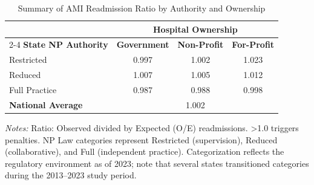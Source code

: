 \begin{table}[htbp]
    \centering
    \caption{Summary of AMI Readmission Ratio by Authority and Ownership}
    \label{tab:rrp_excess_ratio_ami}
    \vspace{0.2cm}
    \begin{tabular}{lccc}
        \toprule
        & \multicolumn{3}{c}{\textbf{Hospital Ownership}} \\
        \cmidrule(lr){2-4}
        \textbf{State NP Authority} & \textbf{Government} & \textbf{Non-Profit} & \textbf{For-Profit} \\
        \midrule
        Restricted & 0.997 & 1.002 & 1.023 \\
        Reduced & 1.007 & 1.005 & 1.012 \\
        Full Practice & 0.987 & 0.988 & 0.998 \\
        \midrule
        \textbf{National Average} & \multicolumn{3}{c}{1.002} \\
        \bottomrule
    \end{tabular}
    \vspace{0.1cm}
    \begin{minipage}{0.85\textwidth}
        \footnotesize \textit{Notes:} Ratio: Observed divided by Expected (O/E) readmissions. >1.0 triggers penalties. NP Law categories represent Restricted (supervision), Reduced (collaborative), and Full (independent practice). Categorization reflects the regulatory environment as of 2023; note that several states transitioned categories during the 2013--2023 study period.
    \end{minipage}
\end{table}